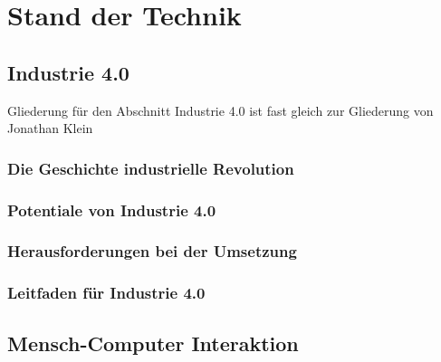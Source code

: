 \chapter{Stand der Technik}\label{cha:StandDerTechnik}

\lipsum[2]

\section{Industrie 4.0}\label{sec:Industrie4.0}
Gliederung für den Abschnitt Industrie 4.0 ist fast gleich zur Gliederung von Jonathan Klein
\newline

\lipsum[2]

\subsection{Die Geschichte industrielle Revolution}\label{sec:IndustrielleRevolution}

\lipsum[2]

\subsection{Potentiale von Industrie 4.0}\label{sec:PotentialeIndustrie4.0}

\lipsum[2]

\subsection{Herausforderungen bei der Umsetzung}\label{sec:HerausforderungenUmsetzung}

\lipsum[2]

\subsection{Leitfaden für Industrie 4.0}\label{sec:LeitfadenUmsetung}

\lipsum[2]

\section{Mensch-Computer Interaktion}\label{sec:HCI}

